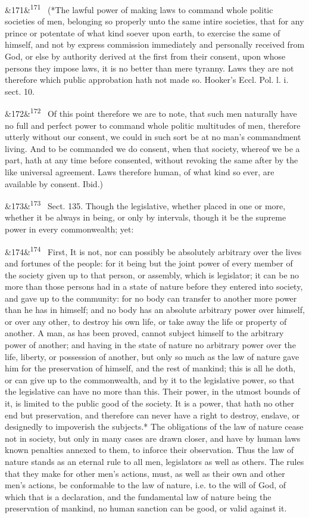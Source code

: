 \documentclass[12pt]{article}
\newcommand{\para}[1][]{\par\noindent\ifx&#1&\else\textsuperscript{\footnotesize #1}~\fi}
\begin{document}
\para[171] (*The lawful power of making laws to command whole politic societies of men, belonging so properly unto the same intire societies, that for any prince or potentate of what kind soever upon earth, to exercise the same of himself, and not by express commission immediately and personally received from God, or else by authority derived at the first from their consent, upon whose persons they impose laws, it is no better than mere tyranny. Laws they are not therefore which public approbation hath not made so. Hooker's Eccl. Pol. l. i. sect. 10.

\para[172] Of this point therefore we are to note, that such men naturally have no full and perfect power to command whole politic multitudes of men, therefore utterly without our consent, we could in such sort be at no man's commandment living. And to be commanded we do consent, when that society, whereof we be a part, hath at any time before consented, without revoking the same after by the like universal agreement. Laws therefore human, of what kind so ever, are available by consent. Ibid.)

\para[173] Sect. 135. Though the legislative, whether placed in one or more, whether it be always in being, or only by intervals, though it be the supreme power in every commonwealth; yet:

\para[174] First, It is not, nor can possibly be absolutely arbitrary over the lives and fortunes of the people: for it being but the joint power of every member of the society given up to that person, or assembly, which is legislator; it can be no more than those persons had in a state of nature before they entered into society, and gave up to the community: for no body can transfer to another more power than he has in himself; and no body has an absolute arbitrary power over himself, or over any other, to destroy his own life, or take away the life or property of another. A man, as has been proved, cannot subject himself to the arbitrary power of another; and having in the state of nature no arbitrary power over the life, liberty, or possession of another, but only so much as the law of nature gave him for the preservation of himself, and the rest of mankind; this is all he doth, or can give up to the commonwealth, and by it to the legislative power, so that the legislative can have no more than this. Their power, in the utmost bounds of it, is limited to the public good of the society. It is a power, that hath no other end but preservation, and therefore can never have a right to destroy, enslave, or designedly to impoverish the subjects.* The obligations of the law of nature cease not in society, but only in many cases are drawn closer, and have by human laws known penalties annexed to them, to inforce their observation. Thus the law of nature stands as an eternal rule to all men, legislators as well as others. The rules that they make for other men's actions, must, as well as their own and other men's actions, be conformable to the law of nature, i.e. to the will of God, of which that is a declaration, and the fundamental law of nature being the preservation of mankind, no human sanction can be good, or valid against it.
\end{document}
